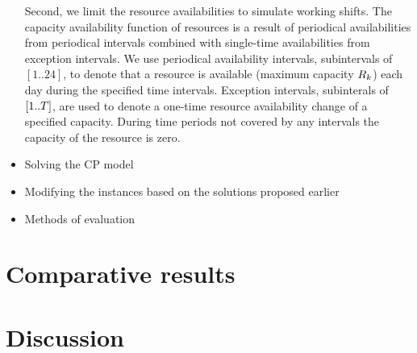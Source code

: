 \begin{itemize}
        Second, we limit the resource availabilities to simulate working shifts. The capacity availability function
        of resources is a result of periodical availabilities from periodical intervals combined with single-time
        availabilities from exception intervals. We use periodical availability intervals, subintervals of $[1 .. 24]$,
        to denote that a resource is available (maximum capacity $R_{k}$) each day during the specified time
        intervals. Exception intervals, subinterals of $[1 .. T]$, are used to denote a one-time resource
        availability change of a specified capacity. During time periods not covered by any intervals the capacity
        of the resource is zero.


    \item Solving the CP model

    \item Modifying the instances based on the solutions proposed earlier

    \item Methods of evaluation
\end{itemize}

\section{Comparative results}

\section{Discussion}
